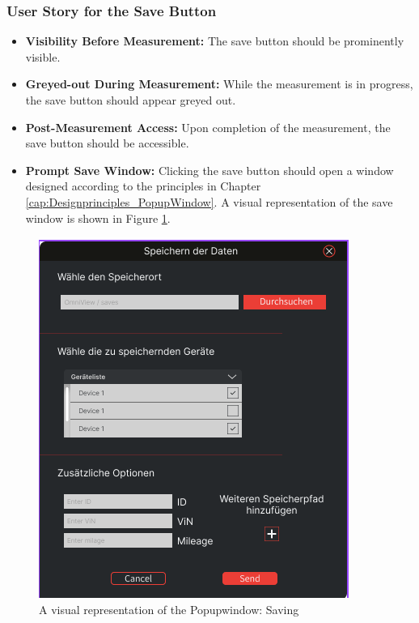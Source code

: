 \documentclass[]{scrreprt}
\begin{document}
\subsubsection{User Story for the Save Button}
\begin{itemize}
\item \textbf{Visibility Before Measurement:} The save button should be prominently visible.
\item \textbf{Greyed-out During Measurement:} While the measurement is in progress, the save button should appear greyed out.
\item \textbf{Post-Measurement Access:} Upon completion of the measurement, the save button should be accessible.
\item \textbf{Prompt Save Window:} Clicking the save button should open a window designed according to the principles in Chapter \ref{cap:Designprinciples_PopupWindow}.
 A visual representation of the save window is shown in Figure \ref{fig:SavingWindow}.
\end{itemize}


\begin{figure}
    \includegraphics[width=.9\textwidth]{assets/pictures/Popupwindow_png.png}
    \caption[]{A visual representation of the Popupwindow: Saving}
    \label{fig:SavingWindow}
    \end{figure}
\end{document}
